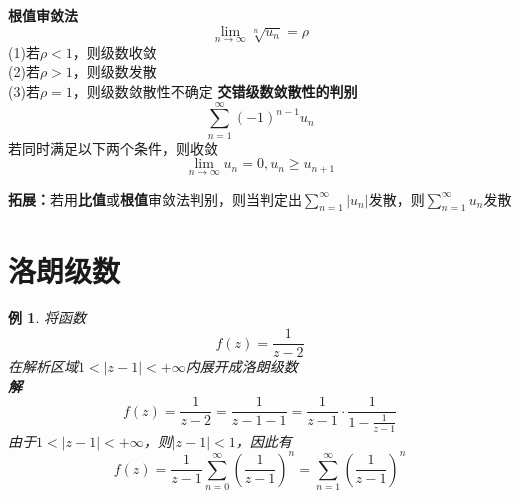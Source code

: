 \documentclass[12pt, a4paper, twoside]{ctexbook}
\newtheorem{example}[theorem]{例}
\begin{document}
\textbf{根值审敛法}
$$
\lim_{n\to\infty}\sqrt[n]{u_n}=\rho
$$
\hspace*{3em}(1)若$\rho<1$，则级数收敛\\
\hspace*{3em}(2)若$\rho>1$，则级数发散\\
\hspace*{3em}(3)若$\rho=1$，则级数敛散性不确定
\newpage
\textbf{交错级数敛散性的判别}
$$
\sum_{n=1}^{\infty}\left(-1\right)^{n-1}u_n
$$
若同时满足以下两个条件，则收敛
$$
\lim_{n\to \infty}u_n=0,u_n\geqslant u_{n+1}
$$

\textbf{拓展：}若用\textbf{比值}或\textbf{根值}审敛法判别，则当判定出$\sum\limits_{n=1}^{\infty}\left|u_n\right|$发散，则$\sum\limits_{n=1}^{\infty}u_n$发散

\section{洛朗级数}
\begin{example}
	将函数
	$$
	f\left(z\right)=\frac{1}{z-2}
	$$
	\hspace*{2em}在解析区域$1<\left|z-1\right|<+\infty$内展开成洛朗级数\\
	\hspace*{1em}\textbf{解}
	$$
	f\left(z\right)=\frac{1}{z-2}=\frac{1}{z-1-1}=\frac{1}{z-1}\cdot \frac{1}{1-\frac{1}{z-1}}
	$$
	\hspace*{2em}由于$1<\left|z-1\right|<+\infty$，则$\left|z-1\right|<1$，因此有
	$$
	f\left(z\right)=\frac{1}{z-1}\sum_{n=0}^{\infty}\left(\frac{1}{z-1}\right)^n=\sum_{n=1}^{\infty}\left(\frac{1}{z-1}\right)^n
	$$
\end{example}
\end{document}
